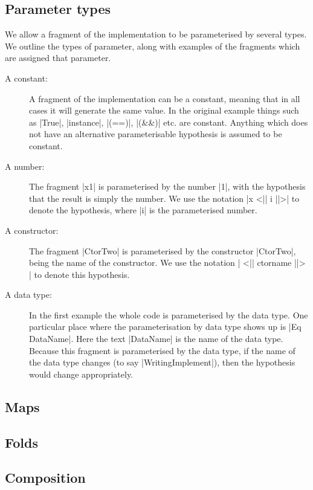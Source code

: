\documentclass{llncs}
\begin{document}
\subsection{Parameter types}

We allow a fragment of the implementation to be parameterised by several types. We outline the types of parameter, along with examples of the fragments which are assigned that parameter.

\begin{description}
\item[A constant:] A fragment of the implementation can be a constant, meaning that in all cases it will generate the same value. In the original example things such as |True|, |instance|, |(==)|, |(&&)| etc. are constant. Anything which does not have an alternative parameterisable hypothesis is assumed to be constant.

\item[A number:] The fragment |x1| is parameterised by the number |1|, with the hypothesis that the result is simply the number. We use the notation |x <|| i ||>| to denote the hypothesis, where |i| is the parameterised number.

\item[A constructor:] The fragment |CtorTwo| is parameterised by the constructor |CtorTwo|, being the name of the constructor. We use the notation | <|| ctorname ||> | to denote this hypothesis.

\item[A data type:] In the first example the whole code is parameterised by the data type. One particular place where the parameterisation by data type shows up is |Eq DataName|. Here the text |DataName| is the name of the data type. Because this fragment is parameterised by the data type, if the name of the data type changes (to say |WritingImplement|), then the hypothesis would change appropriately.
\end{description}

\subsection{Maps}

\subsection{Folds}

\subsection{Composition}
\end{document}
